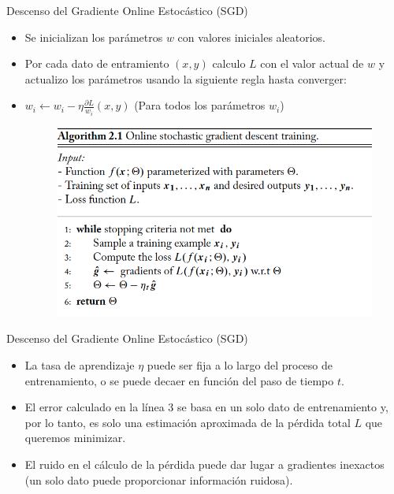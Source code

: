 \documentclass[handout]{beamer}
\begin{document}
\begin{frame}{Descenso del Gradiente Online Estocástico (SGD)}

\begin{scriptsize}
\begin{itemize}
\item Se inicializan los parámetros $w$ con valores iniciales aleatorios.
\item Por cada dato de entramiento $(x,y)$ calculo $L$ con el valor actual de $w$ y actualizo los parámetros usando la siguiente regla hasta converger:
\item $w_i \leftarrow w_i - \eta \frac{\partial L}{w_i}(x,y)$  (Para todos los parámetros $w_i$)

\begin{figure}[htb]
	\centering
	 \includegraphics[scale=0.3]{imagenes/Online-SGD.png}
\end{figure}

\end{itemize}


\end{scriptsize}


\end{frame}

\begin{frame}{Descenso del Gradiente Online Estocástico (SGD)}

\begin{scriptsize}
\begin{itemize}

\item La tasa de aprendizaje $\eta$ puede ser fija a lo largo del proceso de entrenamiento, o se puede decaer en función del paso de tiempo $t$.
\item El error calculado en la línea 3 se basa en un solo dato de entrenamiento  y, por lo tanto, es solo una estimación aproximada de la pérdida total $L$ que queremos minimizar.
\item El ruido en el cálculo de la pérdida puede dar lugar a gradientes inexactos (un solo dato puede proporcionar información ruidosa).
\end{itemize}


\end{scriptsize}


\end{frame}
\end{document}
